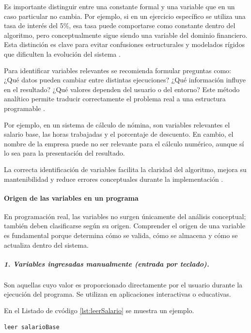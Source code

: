 \documentclass[12pt,twoside]{book}
\begin{document}
					Es importante distinguir entre una constante formal y una variable que en un caso particular no cambia. Por ejemplo, si en un ejercicio específico se utiliza una tasa de interés del 5\%, esa tasa puede comportarse como constante dentro del algoritmo, pero conceptualmente sigue siendo una variable del dominio financiero. Esta distinción es clave para evitar confusiones estructurales y modelados rígidos que dificulten la evolución del sistema \cite{Pressman2019Software,Sommerville2015Software}.
					
					Para identificar variables relevantes se recomienda formular preguntas como: ¿Qué datos pueden cambiar entre distintas ejecuciones? ¿Qué información influye en el resultado? ¿Qué valores dependen del usuario o del entorno? Este método analítico permite traducir correctamente el problema real a una estructura programable \cite{Wing2006Computational}.
					
					Por ejemplo, en un sistema de cálculo de nómina, son variables relevantes el salario base, las horas trabajadas y el porcentaje de descuento. En cambio, el nombre de la empresa puede no ser relevante para el cálculo numérico, aunque sí lo sea para la presentación del resultado.
					
					La correcta identificación de variables facilita la claridad del algoritmo, mejora su mantenibilidad y reduce errores conceptuales durante la implementación \cite{McConnell2004Code}.
					
					\paragraph{Origen de las variables en un programa}
					\noindent
					En programación real, las variables no surgen únicamente del análisis conceptual; también deben clasificarse según su origen. Comprender el origen de una variable es fundamental porque determina cómo se valida, cómo se almacena y cómo se actualiza dentro del sistema.
					
					\subparagraph{1. Variables ingresadas manualmente (entrada por teclado).} Son aquellas cuyo valor es proporcionado directamente por el usuario durante la ejecución del programa. Se utilizan en aplicaciones interactivas o educativas.
					
					En el Listado de cvódigo \ref{lst:leerSalario} se muestra un ejemplo.
					
					\begin{lstlisting}[style=upsamStyle,caption={Pseudocódigo: Variable ingresada manualmente.},label={lst:leerSalario},basicstyle=\small\ttfamily]
	leer salarioBase \end{lstlisting}
					
\end{document}

